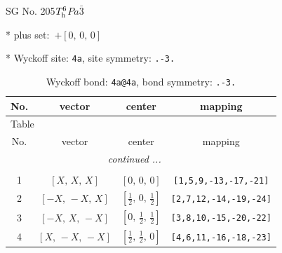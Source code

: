 \documentclass[fleqn,8pt]{jsarticle}
\begin{document}
\setcounter{MaxMatrixCols}{32}

\renewcommand{\tablename}{Table~}
\renewcommand{\figurename}{Figure~}
\begin{center}
\LARGE
SG No. 205\quad$T_{\rm h}^{6}$\quad$Pa\bar{3}$\quad[ cubic ]
\end{center}

* plus set:\,\,\,$+\left[ 0,\, 0,\, 0 \right]$


* Wyckoff site: {\tt 4a}, site symmetry: {\tt .-3.}
\renewcommand{\arraystretch}{1.2}
\begin{longtable}{cccc}
\caption{Wyckoff bond: {\tt 4a@4a}, bond symmetry: {\tt .-3.}}
 \\
 \hline \hline
No. & vector & center & mapping \\ \hline \endfirsthead

\multicolumn{3}{l}{\tablename\ \thetable{}} \\
 \hline \hline
No. & vector & center & mapping \\ \hline \endhead

 \hline \hline
\multicolumn{3}{r}{\footnotesize\it continued ...} \\ \endfoot

 \hline \hline
\multicolumn{3}{r}{} \\ \endlastfoot

1 & $\left[ X,\, X,\, X \right]$ & $\left[ 0,\, 0,\, 0 \right]$ & {\tt [1,5,9,-13,-17,-21]} \\ \hline
2 & $\left[ - X,\, - X,\, X \right]$ & $\left[ \frac{1}{2},\, 0,\, \frac{1}{2} \right]$ & {\tt [2,7,12,-14,-19,-24]} \\ \hline
3 & $\left[ - X,\, X,\, - X \right]$ & $\left[ 0,\, \frac{1}{2},\, \frac{1}{2} \right]$ & {\tt [3,8,10,-15,-20,-22]} \\ \hline
4 & $\left[ X,\, - X,\, - X \right]$ & $\left[ \frac{1}{2},\, \frac{1}{2},\, 0 \right]$ & {\tt [4,6,11,-16,-18,-23]} \\
\end{longtable}
\renewcommand{\arraystretch}{1.2}
\end{document}
